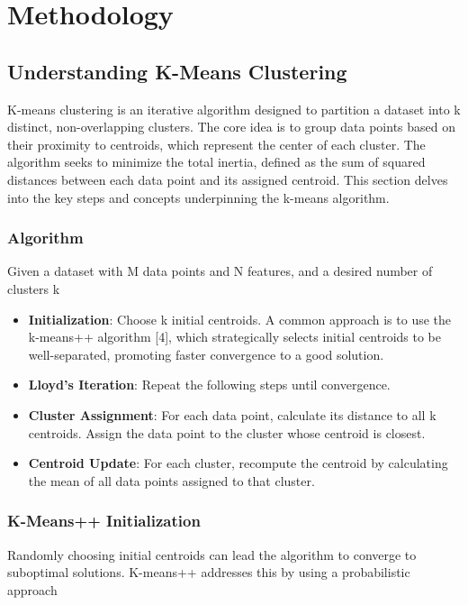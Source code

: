 \documentclass[conference]{IEEEtran}
\begin{document}
\section{Methodology}
\subsection{Understanding K-Means Clustering}
K-means clustering is an iterative algorithm designed to partition a dataset into k distinct, non-overlapping clusters. The core idea is to group data points based on their proximity to centroids, which represent the center of each cluster. The algorithm seeks to minimize the total inertia, defined as the sum of squared distances between each data point and its assigned centroid. This section delves into the key steps and concepts underpinning the k-means algorithm.

\subsubsection{Algorithm}
Given a dataset with M data points and N features, and a desired number of clusters k

\begin{itemize}
    \item \textbf{Initialization}: Choose k initial centroids. A common approach is to use the k-means++ algorithm [4], which strategically selects initial centroids to be well-separated, promoting faster convergence to a good solution.

    \item \textbf{Lloyd's Iteration}: Repeat the following steps until convergence.

    \item \textbf{Cluster Assignment}: For each data point, calculate its distance to all k centroids. Assign the data point to the cluster whose centroid is closest.

    \item \textbf{Centroid Update}: For each cluster, recompute the centroid by calculating the mean of all data points assigned to that cluster.
\end{itemize}

\subsubsection{K-Means++ Initialization}
Randomly choosing initial centroids can lead the algorithm to converge to suboptimal solutions. K-means++ addresses this by using a probabilistic approach
\end{document}
